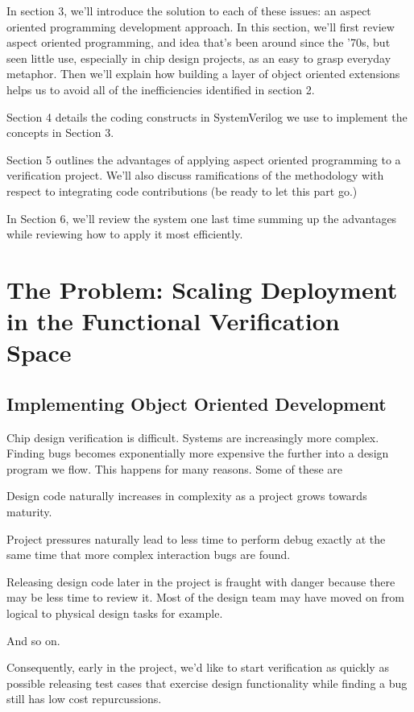 \documentclass[twocolumn,letterpaper]{IEEEAerospaceCLS}  %
\begin{document}
In section 3, we'll introduce the solution to each of these issues: an aspect oriented programming development approach. In this section, we'll first review aspect oriented programming, and idea that's been around since the '70s, but seen little use, especially in chip design projects, as an easy to grasp everyday metaphor. Then we'll explain how building a layer of object oriented extensions helps us to avoid all of the inefficiencies identified in section 2.

Section 4 details the coding constructs in SystemVerilog we use to implement the concepts in Section 3. 

Section 5 outlines the advantages of applying aspect oriented programming to a verification project. We'll also discuss ramifications of the methodology with respect to integrating code contributions (be ready to let this part go.)

In Section 6, we'll review the system one last time summing up the advantages while reviewing how to apply it most efficiently.




\section{The Problem: Scaling Deployment in the Functional Verification Space}
\subsection{Implementing Object Oriented Development}
Chip design verification is difficult. Systems are increasingly more complex. Finding bugs becomes exponentially more expensive the further into a design program we flow. This happens for many reasons. Some of these are 

Design code naturally increases in complexity as a project grows towards maturity.  

Project pressures naturally lead to less time to perform debug exactly at the same time that more complex interaction bugs are found.

Releasing design code later in the project is fraught with danger because there may be less time to review it. Most of the design team may have moved on from logical to physical design tasks for example.

And so on.

Consequently, early in the project, we'd like to start verification as quickly as possible releasing test cases that exercise design functionality while finding a bug still has low cost repurcussions.
\end{document}
